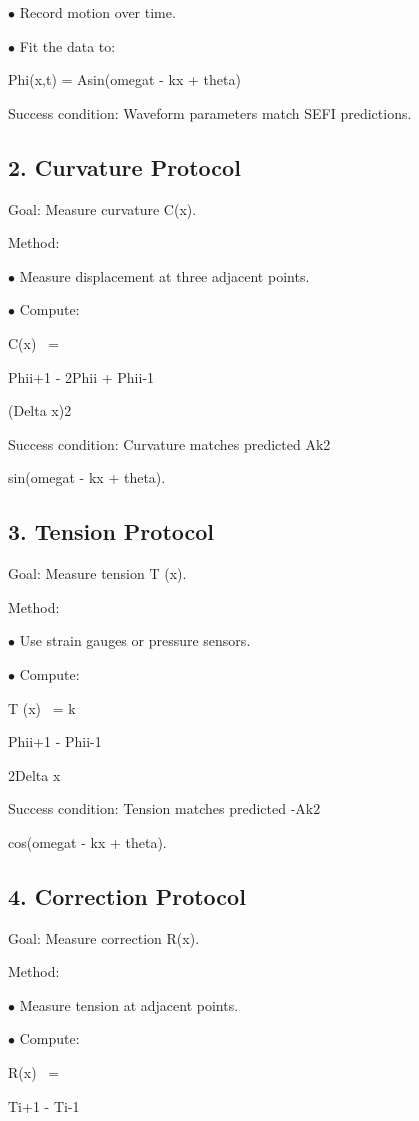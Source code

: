\documentclass[10pt]{article}
\begin{document}
\noindent $\bullet$ Record motion over time.

\noindent $\bullet$ Fit the data to:

Phi(x,t) = Asin(omegat - kx + theta)

Success condition: Waveform parameters match SEFI predictions.

\subsection*{2. Curvature Protocol}
Goal: Measure curvature C(x).

Method:

\noindent $\bullet$ Measure displacement at three adjacent points.

\noindent $\bullet$ Compute:

C(x) ~=

Phii+1 - 2Phii + Phii-1

(Delta x)2

Success condition: Curvature matches predicted Ak2

sin(omegat - kx + theta).


\subsection*{3. Tension Protocol}
Goal: Measure tension T (x).

Method:

\noindent $\bullet$ Use strain gauges or pressure sensors.

\noindent $\bullet$ Compute:

T (x) ~= k

Phii+1 - Phii-1

2Delta x

Success condition: Tension matches predicted -Ak2

cos(omegat - kx + theta).

\subsection*{4. Correction Protocol}
Goal: Measure correction R(x).

Method:

\noindent $\bullet$ Measure tension at adjacent points.

\noindent $\bullet$ Compute:

R(x) ~=

Ti+1 - Ti-1
\end{document}
